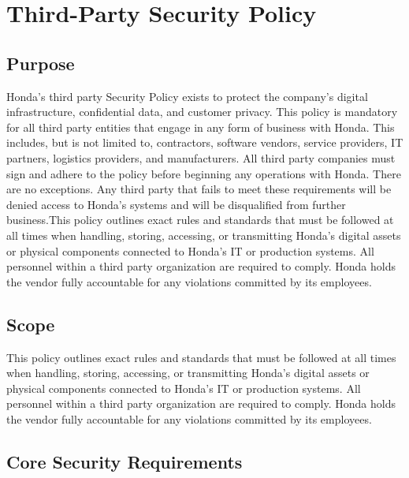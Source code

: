 \chapter{Third-Party Security Policy}
\pagestyle{fancy}

\fancyhf{}

\fancyfoot[C]{\thepage}

\renewcommand{\headrulewidth}{0pt}
\renewcommand{\footrulewidth}{0pt}


\section{Purpose}
Honda’s third party Security Policy exists to protect the company’s digital infrastructure, confidential data, and customer privacy. This policy is mandatory for all third party entities that engage in any form of business with Honda. This includes, but is not limited to, contractors, software vendors, service providers, IT partners, logistics providers, and manufacturers. All third party companies must sign and adhere to the policy before beginning any operations with Honda. There are no exceptions. Any third party that fails to meet these requirements will be denied access to Honda’s systems and will be disqualified from further business.This policy outlines exact rules and standards that must be followed at all times when handling, storing, accessing, or transmitting Honda’s digital assets or physical components connected to Honda’s IT or production systems. All personnel within a third party organization are required to comply. Honda holds the vendor fully accountable for any violations committed by its employees.

\section{Scope}
This policy outlines exact rules and standards that must be followed at all times when handling, storing, accessing, or transmitting Honda’s digital assets or physical components connected to Honda’s IT or production systems. All personnel within a third party organization are required to comply. Honda holds the vendor fully accountable for any violations committed by its employees.

\section{Core Security Requirements}

